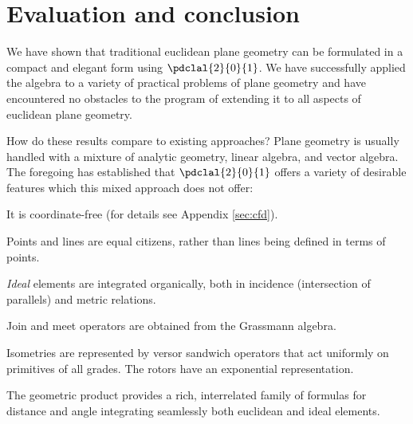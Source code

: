 \documentclass[12pt]{article}
\begin{document}
\section{Evaluation and conclusion}
\label{sec:eac}
We  have shown that traditional euclidean plane geometry can be formulated in a compact and elegant form using $\pdclal{2}{0}{1}$.  We have successfully applied the algebra  to a variety of practical problems of plane geometry and have encountered no obstacles to the program of extending it to all aspects of euclidean plane geometry.  

How do these results compare to existing approaches?  Plane geometry is usually handled with a mixture of analytic geometry, linear algebra, and vector algebra.  The foregoing has established that  $\pdclal{2}{0}{1}$ offers a variety of desirable  features which this mixed approach does not offer:
\begin{compactenum}
\item It is coordinate-free (for details see Appendix \ref{sec:cfd}).
\item Points and lines are equal citizens, rather than  lines being defined in terms of points.
\item \emph{Ideal} elements are integrated organically, both in incidence (intersection of parallels) and metric relations.
\item Join and meet operators are obtained from the Grassmann algebra.
\item Isometries are represented by versor sandwich operators that act uniformly on primitives of all grades.  The rotors have an exponential representation.
\item The geometric product provides a rich, interrelated family of formulas for distance and angle integrating seamlessly both euclidean and ideal elements.
\end{compactenum}
\end{document}
